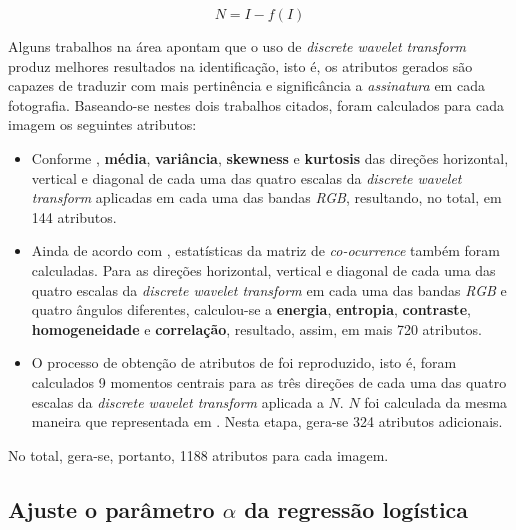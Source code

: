 \documentclass[10pt,twocolumn,letterpaper]{article}
\begin{document}
\begin{equation}
\label{eq:noise}
N = I - f(I)
\end{equation}

Alguns trabalhos \cite{5337441}\cite{6913721} na área apontam que o uso de \textit{discrete wavelet transform} produz melhores resultados na identificação, isto é, os atributos gerados são capazes de traduzir com mais pertinência e significância a \textit{assinatura} em cada fotografia. Baseando-se nestes dois trabalhos citados, foram calculados para cada imagem os seguintes atributos:

\begin{itemize}
  \item Conforme \cite{5337441}, \textbf{média}, \textbf{variância}, \textbf{skewness} e \textbf{kurtosis} das direções horizontal, vertical e diagonal de cada uma das quatro escalas da \textit{discrete wavelet transform} aplicadas em cada uma das bandas \textit{RGB}, resultando, no total, em 144 atributos.
  \item Ainda de acordo com \cite{5337441}, estatísticas da matriz de \textit{co-ocurrence} também foram calculadas. Para as direções horizontal, vertical e diagonal de cada uma das quatro escalas da \textit{discrete wavelet transform} em cada uma das bandas \textit{RGB} e quatro ângulos diferentes, calculou-se a \textbf{energia}, \textbf{entropia}, \textbf{contraste}, \textbf{homogeneidade} e \textbf{correlação}, resultado, assim, em mais 720 atributos.
  \item O processo de obtenção de atributos de \cite{6913721} foi reproduzido, isto é, foram calculados 9 momentos centrais para as três direções de cada uma das quatro escalas da \textit{discrete wavelet transform} aplicada a \(N\). \(N\) foi calculada da mesma maneira que representada em \cite{6913721}. Nesta etapa, gera-se 324 atributos adicionais.
\end{itemize}

No total, gera-se, portanto, 1188 atributos para cada imagem.

\subsection{Ajuste o parâmetro \(\alpha\) da regressão logística}
\label{sec:ajuste}
\end{document}
